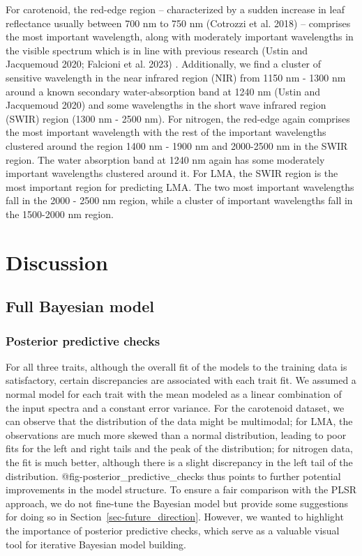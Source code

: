 \documentclass[
  letterpaper,
  DIV=11,
  numbers=noendperiod]{scrartcl}
\begin{document}
For carotenoid, the red-edge region -- characterized by a sudden
increase in leaf reflectance usually between 700 nm to 750 nm (Cotrozzi
et al. 2018) -- comprises the most important wavelength, along with
moderately important wavelengths in the visible spectrum which is in
line with previous research (Ustin and Jacquemoud 2020; Falcioni et al.
2023) . Additionally, we find a cluster of sensitive wavelength in the
near infrared region (NIR) from 1150 nm - 1300 nm around a known
secondary water-absorption band at 1240 nm (Ustin and Jacquemoud 2020)
and some wavelengths in the short wave infrared region (SWIR) region
(1300 nm - 2500 nm). For nitrogen, the red-edge again comprises the most
important wavelength with the rest of the important wavelengths
clustered around the region 1400 nm - 1900 nm and 2000-2500 nm in the
SWIR region. The water absorption band at 1240 nm again has some
moderately important wavelengths clustered around it. For LMA, the SWIR
region is the most important region for predicting LMA. The two most
important wavelengths fall in the 2000 - 2500 nm region, while a cluster
of important wavelengths fall in the 1500-2000 nm region.

\hypertarget{discussion}{%
\section{Discussion}\label{discussion}}

\hypertarget{full-bayesian-model-1}{%
\subsection{Full Bayesian model}\label{full-bayesian-model-1}}

\hypertarget{posterior-predictive-checks}{%
\subsubsection{Posterior predictive
checks}\label{posterior-predictive-checks}}

For all three traits, although the overall fit of the models to the
training data is satisfactory, certain discrepancies are associated with
each trait fit. We assumed a normal model for each trait with the mean
modeled as a linear combination of the input spectra and a constant
error variance. For the carotenoid dataset, we can observe that the
distribution of the data might be multimodal; for LMA, the observations
are much more skewed than a normal distribution, leading to poor fits
for the left and right tails and the peak of the distribution; for
nitrogen data, the fit is much better, although there is a slight
discrepancy in the left tail of the distribution.
@fig-posterior\_predictive\_checks thus points to further potential
improvements in the model structure. To ensure a fair comparison with
the PLSR approach, we do not fine-tune the Bayesian model but provide
some suggestions for doing so in Section~\ref{sec-future_direction}.
However, we wanted to highlight the importance of posterior predictive
checks, which serve as a valuable visual tool for iterative Bayesian
model building.
\end{document}
